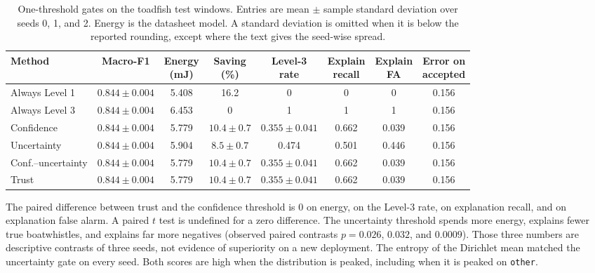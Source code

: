 \documentclass[sn-mathphys-num]{sn-jnl}%
\theoremstyle{thmstyleone}%
\theoremstyle{thmstyletwo}%
\theoremstyle{thmstylethree}%
\begin{document}
\begin{table}[!htbp]
\centering
\caption{One-threshold gates on the toadfish test windows. Entries are mean $\pm$ sample standard deviation over seeds 0, 1, and 2. Energy is the datasheet model. A standard deviation is omitted when it is below the reported rounding, except where the text gives the seed-wise spread.}
\label{tab:gates}
\footnotesize
\setlength{\tabcolsep}{3pt}
\begin{tabular}{|l|c|c|c|c|c|c|c|}
\hline
\textbf{Method} & \textbf{Macro-F1} & \makecell{\textbf{Energy}\\\textbf{(mJ)}} & \makecell{\textbf{Saving}\\\textbf{(\%)}} & \makecell{\textbf{Level-3}\\\textbf{rate}} & \makecell{\textbf{Explain}\\\textbf{recall}} & \makecell{\textbf{Explain}\\\textbf{FA}} & \makecell{\textbf{Error on}\\\textbf{accepted}} \\
\hline
Always Level 1 & $0.844 \pm 0.004$ & 5.408 & 16.2 & 0 & 0 & 0 & 0.156 \\
\hline
Always Level 3 & $0.844 \pm 0.004$ & 6.453 & 0 & 1 & 1 & 1 & 0.156 \\
\hline
Confidence & $0.844 \pm 0.004$ & 5.779 & $10.4 \pm 0.7$ & $0.355 \pm 0.041$ & 0.662 & 0.039 & 0.156 \\
\hline
Uncertainty & $0.844 \pm 0.004$ & 5.904 & $8.5 \pm 0.7$ & 0.474 & 0.501 & 0.446 & 0.156 \\
\hline
Conf.--uncertainty & $0.844 \pm 0.004$ & 5.779 & $10.4 \pm 0.7$ & $0.355 \pm 0.041$ & 0.662 & 0.039 & 0.156 \\
\hline
Trust & $0.844 \pm 0.004$ & 5.779 & $10.4 \pm 0.7$ & $0.355 \pm 0.041$ & 0.662 & 0.039 & 0.156 \\
\hline
\end{tabular}
\end{table}

The paired difference between trust and the confidence threshold is 0 on energy, on the Level-3 rate, on explanation recall, and on explanation false alarm. A paired $t$ test is undefined for a zero difference. The uncertainty threshold spends more energy, explains fewer true boatwhistles, and explains far more negatives (observed paired contrasts $p = 0.026$, $0.032$, and $0.0009$). Those three numbers are descriptive contrasts of three seeds, not evidence of superiority on a new deployment. The entropy of the Dirichlet mean matched the uncertainty gate on every seed. Both scores are high when the distribution is peaked, including when it is peaked on \texttt{other}.
\end{document}
